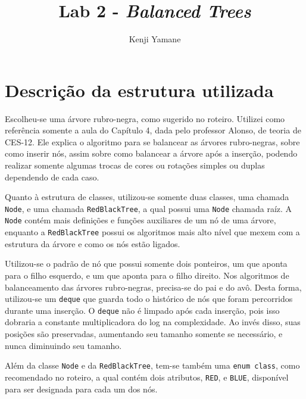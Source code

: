 \documentclass{article}[twocolumn]
\title{Lab 2 - \textit{Balanced Trees}}
\author{Kenji Yamane}
\begin{document}
	\maketitle
	\section{Descri\c{c}\~ao da estrutura utilizada}
	Escolheu-se uma \'arvore rubro-negra, como sugerido no roteiro. Utilizei como refer\^encia
	somente a aula do Cap\'itulo 4, dada pelo professor Alonso, de teoria de CES-12. Ele explica
	o algoritmo para se balancear as \'arvores rubro-negras, sobre como inserir n\'os, assim
	sobre como balancear a \'arvore ap\'os a inser\c{c}\~ao, podendo realizar somente algumas
	trocas de cores ou rota\c{c}\~oes simples ou duplas dependendo de cada caso.

	Quanto \`a estrutura de classes, utilizou-se somente duas classes, uma chamada \texttt{Node},
	e uma chamada \texttt{RedBlackTree}, a qual possui uma \texttt{Node} chamada ra\'iz. A
	\texttt{Node} cont\'em mais defini\c{c}\~oes e fun\c{c}\~oes auxiliares de um n\'o de uma
	\'arvore, enquanto a \texttt{RedBlackTree} possui os algoritmos mais alto n\'ivel que
	mexem com a estrutura da \'arvore e como os n\'os est\~ao ligados.

	Utilizou-se o padr\~ao de n\'o que possui somente dois ponteiros, um que aponta para o filho
	esquerdo, e um que aponta para o filho direito. Nos algoritmos de balanceamento das \'arvores
	rubro-negras, precisa-se do pai e do av\^o. Desta forma, utilizou-se um \texttt{deque} que
	guarda todo o hist\'orico de n\'os que foram percorridos durante uma inser\c{c}\~ao. O
	\texttt{deque} n\~ao \'e limpado ap\'os cada inser\c{c}\~ao, pois isso dobraria a constante
	multiplicadora do log na complexidade. Ao inv\'es disso, suas posi\c{c}\~oes s\~ao preservadas,
	aumentando seu tamanho somente se necess\'ario, e nunca diminuindo seu tamanho.

	Al\'em da classe \texttt{Node} e da \texttt{RedBlackTree}, tem-se tamb\'em uma
	\texttt{enum class}, como recomendado no roteiro, a qual cont\'em dois atributos,
	\texttt{RED}, e \texttt{BLUE}, dispon\'ivel para ser designada para cada um dos n\'os.
\end{document}
